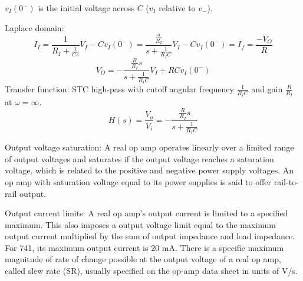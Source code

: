\documentclass[a4paper,12pt]{report}
\begin{document}
$v_I(0^-)$ is the initial voltage across $C$ ($v_I$ relative to $v_-$).

Laplace domain:
\[I_I=\frac{1}{R_I+\frac{1}{Cs}}V_I-Cv_I(0^-)=\frac{\frac{s}{R_I}}{s+\frac{1}{R_IC}}V_I-Cv_I(0^-)=I_f=\frac{-V_O}{R}\]
\[V_O=-\frac{\frac{R}{R_I}s}{s+\frac{1}{R_IC}}V_I+RCv_I(0^-)\]
Transfer function: STC high-pass with cutoff angular frequency $\frac{1}{R_IC}$ and gain $\frac{R}{R_I}$ at $\omega=\infty$.
\[H(s)=\frac{V_o}{V_i}=-\frac{\frac{R}{R_I}s}{s+\frac{1}{R_IC}}\]
\bit
\item Output voltage saturation: A real op amp operates linearly over a limited range of output voltages and saturates if the output voltage reaches a saturation voltage, which is related to the positive and negative power supply voltages. An op amp with saturation voltage equal to its power supplies is said to offer rail-to-rail output.
\item Output current limits: A real op amp's output current is limited to a specified maximum. This also imposes a output voltage limit equal to the maximum output current multiplied by the sum of output impedance and load impedance. For 741, its maximum output current is 20 mA.
\eit
{}
There is a specific maximum magnitude of rate of change possible at the output voltage of a real op amp, called slew rate (SR), usually specified on the op-amp data sheet in units of V/\textmu{}s.
\end{document}
